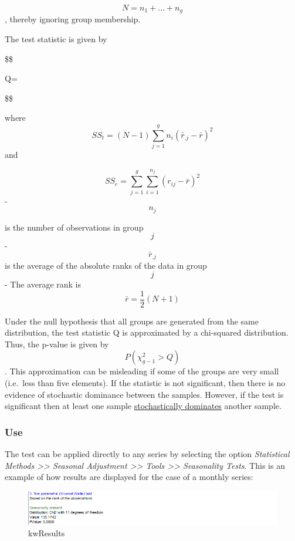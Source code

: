 \documentclass[
  letterpaper,
  DIV=11,
  numbers=noendperiod]{scrreprt}
\begin{document}
\[ N=n_1+ \dots + n_g \], thereby ignoring group membership.

The test statistic is given by

\$\$

Q=

\$\$

where \[ SS_t=(N-1)\sum_{j=1}^{g}n_i(\bar{r}_{.j}-\bar{r})^2 \] and

\[ SS_e=\sum_{j=1}^{g}\sum_{i=1}^{n_j}(r_{ij}-\bar{r})^2 \] - \[ n_j \]

is the number of observations in group \[ j  \] - \[ \bar{r}_{.j} \] is
the average of the absolute ranks of the data in group \[ j  \] - The
average rank is \[ \bar{r} =\frac{1}{2}(N+1) \]

Under the null hypothesis that all groups are generated from the same
distribution, the test statistic Q is approximated by a chi-squared
distribution. Thus, the p-value is given by \[ P( \chi^2_{g-1}>Q) \].
This approximation can be misleading if some of the groups are very
small (i.e.~less than five elements). If the statistic is not
significant, then there is no evidence of stochastic dominance between
the samples. However, if the test is significant then at least one
sample
\href{http://en.wikipedia.org/wiki/Stochastic_dominance}{stochastically
dominates} another sample.

\hypertarget{use}{%
\subsubsection{Use}\label{use}}

The test can be applied directly to any series by selecting the option
\emph{Statistical Methods \textgreater\textgreater{} Seasonal Adjustment
\textgreater\textgreater{} Tools \textgreater\textgreater{} Seasonality
Tests}. This is an example of how results are displayed for the case of
a monthly series:

\begin{figure}

{\centering \includegraphics{./All_images/kw.png}

}

\caption{kwResults}

\end{figure}
\end{document}
